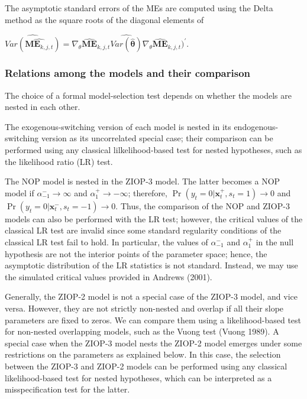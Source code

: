 \documentclass[letterpaper,fleqn,12pt]{article}
\begin{document}
\begin{onehalfspace}
The asymptotic standard errors of the MEs are computed using the Delta
method as the square roots of the diagonal elements of

\begin{center}
$\widehat{Var(\widehat{\underset{}{\mathbf{ME}_{k,j,t}}})}=\nabla _{\theta }%
\widehat{\mathbf{ME}}_{k,j,t}\widehat{Var(\widehat{\mathbf{\theta }})}\nabla
_{\theta }\widehat{\mathbf{ME}}_{k,j,t})^{\prime }$.
\end{center}

\subsubsection*{\noindent Relations among the models and their comparison}

The choice of a formal model-selection test depends on whether the models
are nested in each other.

The exogenous-switching version of each model is nested in its
endogenous-switching version as its uncorrelated special case; their
comparison can be performed using any classical lilkelihood-based test for
nested hypotheses, such as the likelihood ratio (LR) test.

The NOP model is nested in the ZIOP-3 model. The latter becomes a NOP model
if $\alpha _{-1}^{-}\rightarrow \infty $ and $\alpha _{1}^{+}\rightarrow
-\infty $; therefore, $\Pr (y_{t}=0|\mathbf{x}_{t}^{+},s_{t}=1)\rightarrow 0$
and $\Pr (y_{t}=0|\mathbf{x}_{t}^{-},s_{t}=-1)\rightarrow 0$. Thus, the
comparison of the NOP and ZIOP-3 models can also be performed with the LR
test; however, the critical values of the classical LR test are invalid
since some standard regularity conditions of the classical LR test fail to
hold. In particular, the values of $\alpha _{-1}^{-}$ and $\alpha _{1}^{+}$
in the null hypothesis are not the interior points of the parameter space;
hence, the asymptotic distribution of the LR statistics is not standard.
Instead, we may use the simulated critical values provided in Andrews (2001).

Generally, the ZIOP-2 model is not a special case of the ZIOP-3 model, and
vice versa. However, they are not strictly non-nested and overlap if all
their slope parameters are fixed to zeros. We can compare them using a
likelihood-based test for non-nested overlapping models, such as the Vuong
test (Vuong 1989). A special case when the ZIOP-3 model nests the ZIOP-2
model emerges under some restrictions on the parameters as explained below.
In this case, the selection between the ZIOP-3 and ZIOP-2 models can be
performed using any classical likelihood-based test for nested hypotheses,
which can be interpreted as a misspecification test for the latter.


\end{onehalfspace}
\end{document}
